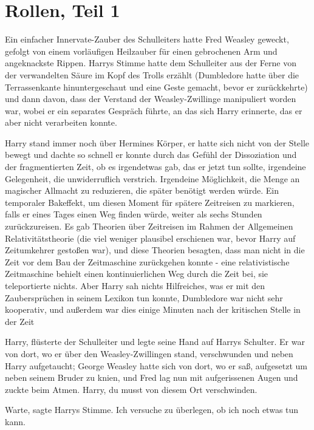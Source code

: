 \chapter{Rollen, Teil 1}

Ein einfacher Innervate-Zauber des Schulleiters hatte Fred Weasley geweckt,
gefolgt von einem vorläufigen Heilzauber für einen gebrochenen Arm und
angeknackste Rippen. Harrys Stimme hatte dem Schulleiter aus der Ferne von der
verwandelten Säure im Kopf des Trolls erzählt (Dumbledore hatte über die
Terrassenkante hinuntergeschaut und eine Geste gemacht, bevor er zurückkehrte)
und dann davon, dass der Verstand der Weasley-Zwillinge manipuliert worden war,
wobei er ein separates Gespräch führte, an das sich Harry erinnerte, das er aber
nicht verarbeiten konnte.

Harry stand immer noch über Hermines Körper, er hatte sich nicht von der Stelle
bewegt und dachte so schnell er konnte durch das Gefühl der Dissoziation und der
fragmentierten Zeit, ob es irgendetwas gab, das er jetzt tun sollte, irgendeine
Gelegenheit, die unwiderruflich verstrich. Irgendeine Möglichkeit, die Menge an
magischer Allmacht zu reduzieren, die später benötigt werden würde. Ein
temporaler Bakeffekt, um diesen Moment für spätere Zeitreisen zu markieren,
falls er eines Tages einen Weg finden würde, weiter als sechs Stunden
zurückzureisen. Es gab Theorien über Zeitreisen im Rahmen der Allgemeinen
Relativitätstheorie (die viel weniger plausibel erschienen war, bevor Harry auf
Zeitumkehrer gestoßen war), und diese Theorien besagten, dass man nicht in die
Zeit vor dem Bau der Zeitmaschine zurückgehen konnte - eine relativistische
Zeitmaschine behielt einen kontinuierlichen Weg durch die Zeit bei, sie
teleportierte nichts. Aber Harry sah nichts Hilfreiches, was er mit den
Zaubersprüchen in seinem Lexikon tun konnte, Dumbledore war nicht sehr
kooperativ, und außerdem war dies einige Minuten nach der kritischen Stelle in
der Zeit

\glqq{}Harry\grqq{}, flüsterte der Schulleiter und legte seine Hand auf Harrys
Schulter. Er war von dort, wo er über den Weasley-Zwillingen stand, verschwunden
und neben Harry aufgetaucht; George Weasley hatte sich von dort, wo er saß,
aufgesetzt um neben seinem Bruder zu knien, und Fred lag nun mit aufgerissenen
Augen und zuckte beim Atmen. \glqq{}Harry, du musst von diesem Ort
verschwinden.\grqq{}

\glqq{}Warte\grqq{}, sagte Harrys Stimme. \glqq{}Ich versuche zu überlegen, ob ich
noch etwas tun kann.\grqq{}

